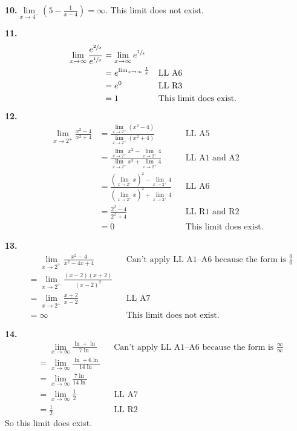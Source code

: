 \documentclass[12pt,]{book}
\theoremstyle{plain}
\theoremstyle{definition}
\numberwithin{equation}{section}
\newcommand{\fe}[2]{\mathop{{#1}{\left(#2\right)}}}
\begin{document}
\par\smallskip
\noindent\textbf{10.}\quad{}\(\lim\limits_{x\to4^{-}}\left(5-\frac{1}{x-4}\right)=\infty\). This limit does not exist.%
\par\smallskip
\noindent\textbf{11.}\quad{}\begin{align*}
\lim\limits_{x\to\infty}\frac{e^{\sfrac{2}{x}}}{e^{\sfrac{1}{x}}}&=\lim\limits_{x\to\infty}e^{\sfrac{1}{x}}\\
&=e^{\lim_{x\to\infty}\frac{1}{x}}&&\text{LL A6}\\
&=e^{0}&&\text{LL R3}\\
&=1&&\text{This limit does exist.}
\end{align*}%
\par\smallskip
\noindent\textbf{12.}\quad{}\begin{align*}
\lim\limits_{x\to2^{+}}\frac{x^2-4}{x^2+4}&=\frac{\lim\limits_{x\to2^{+}}\left(x^2-4\right)}{\lim\limits_{x\to2^{+}}\left(x^2+4\right)}&&\text{LL A5}\\
&=\frac{\lim\limits_{x\to2^{+}}x^2-\lim\limits_{x\to2^{+}}4}{\lim\limits_{x\to2^{+}}x^2+\lim\limits_{x\to2^{+}}4}&&\text{LL A1 and A2}\\
&=\frac{\left(\lim\limits_{x\to2^{+}}x\right)^2-\lim\limits_{x\to2^{+}}4}{\left(\lim\limits_{x\to2^{+}}x\right)^2+\lim\limits_{x\to2^{+}}4}&&\text{LL A6}\\
&=\frac{2^2-4}{2^2+4}&&\text{LL R1 and R2}\\
&=0&&\text{This limit does exist.}
\end{align*}%
\par\smallskip
\noindent\textbf{13.}\quad{}\begin{align*}
&\phantom{={}}\lim\limits_{x\to2^{+}}\frac{x^2-4}{x^2-4x+4}&&\text{Can't apply LL A1--A6 because the form is $\tfrac{0}{0}$}\\
&=\lim\limits_{x\to2^{+}}\frac{(x-2)(x+2)}{(x-2)^2}\\
&=\lim\limits_{x\to2^{+}}\frac{x+2}{x-2}&&\text{LL A7}\\
&=\infty&&\text{This limit does not exist.}
\end{align*}%
\par\smallskip
\noindent\textbf{14.}\quad{}\begin{align*}
&\phantom{={}}\lim\limits_{x\to\infty}\frac{\fe{\ln}{x}+\fe{\ln}{x^6}}{7\fe{\ln}{x^2}}&&\text{Can't apply LL A1--A6 because the form is $\tfrac{\infty}{\infty}$}\\
&=\lim\limits_{x\to\infty}\frac{\fe{\ln}{x}+6\fe{\ln}{x}}{14\fe{\ln}{x}}\\
&=\lim\limits_{x\to\infty}\frac{7\fe{\ln}{x}}{14\fe{\ln}{x}}\\
&=\lim\limits_{x\to\infty}\frac{1}{2}&&\text{LL A7}\\
&=\frac{1}{2}&&\text{LL R2}
\end{align*}So this limit does exist.%
\end{document}
